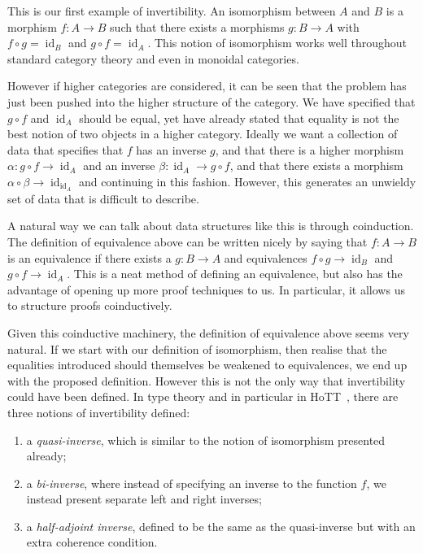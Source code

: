 \documentclass[draft]{article}
\DeclareMathOperator{\id}{id}
\begin{document}
This is our first example of invertibility. An isomorphism between
\(A\) and \(B\) is a morphism \(f : A \to B\) such that there exists a
morphisms \(g : B \to A\) with \(f \circ g = \id_B\) and \(g \circ f =
\id_A\). This notion of isomorphism works well throughout standard
category theory and even in monoidal categories.

However if higher categories are considered, it can be seen that the
problem has just been pushed into the higher structure of the
category. We have specified that \(g \circ f\) and \(\id_A\) should be
equal, yet have already stated that equality is not the best notion of
two objects in a higher category. Ideally we want a collection of data
that specifies that \(f\) has an inverse \(g\), and that there is a
higher morphism \(\alpha : g \circ f \to \id_A\) and an inverse
\(\beta : \id_A \to g \circ f\), and that there exists a morphism
\(\alpha \circ \beta \to \id_{\id_A}\) and continuing in this fashion.
However, this generates an unwieldy set of data that is difficult to
describe.

A natural way we can talk about data structures like this is through
coinduction. The definition of equivalence above can be written nicely
by saying that \(f : A \to B\) is an equivalence if there exists a \(g
: B \to A\) and equivalences \(f \circ g \to \id_B\) and \(g \circ f
\to \id_A\). This is a neat method of defining an equivalence, but
also has the advantage of opening up more proof techniques to us. In
particular, it allows us to structure proofs coinductively.

Given this coinductive machinery, the definition of equivalence above
seems very natural. If we start with our definition of isomorphism,
then realise that the equalities introduced should themselves be
weakened to equivalences, we end up with the proposed definition.
However this is not the only way that invertibility could have been
defined. In type theory and in particular in HoTT~\cite{hottbook},
there are three notions of invertibility defined:

\begin{enumerate}
\item a \emph{quasi-inverse}, which is similar to the notion of
  isomorphism presented already;
\item a \emph{bi-inverse}, where instead of specifying an inverse to
  the function \(f\), we instead present separate left and right
  inverses;
\item a \emph{half-adjoint inverse}, defined to be the same as the
  quasi-inverse but with an extra coherence condition.
\end{enumerate}
\end{document}
